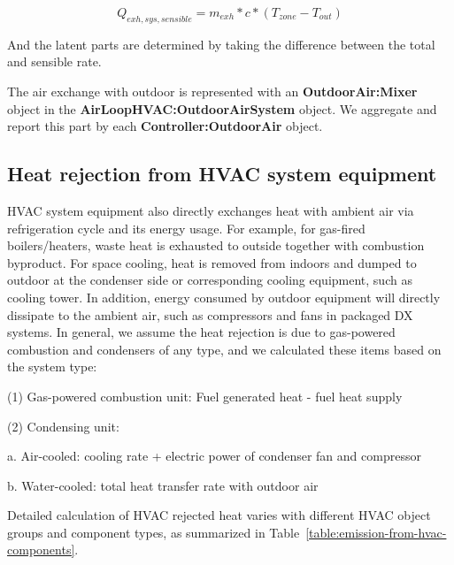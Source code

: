 \begin{equation}  \label{eq:he-7}
Q_{exh, sys, sensible} = m_{exh} * c * (T_{zone} - T_{out})
\end{equation}

And the latent parts are determined by taking the difference between the total and sensible rate.

The air exchange with outdoor is represented with an \textbf{OutdoorAir:Mixer} object in the \textbf{AirLoopHVAC:OutdoorAirSystem} object. We aggregate and report this part by each \textbf{Controller:OutdoorAir} object.

\subsection{Heat rejection from HVAC system equipment}\label{emission-from-HVAC-reject}

HVAC system equipment also directly exchanges heat with ambient air via refrigeration cycle and its energy usage. For example, for gas-fired boilers/heaters, waste heat is exhausted to outside together with combustion byproduct. For space cooling, heat is removed from indoors and dumped to outdoor at the condenser side or corresponding cooling equipment, such as cooling tower. In addition, energy consumed by outdoor equipment will directly dissipate to the ambient air, such as compressors and fans in packaged DX systems. In general, we assume the heat rejection is due to gas-powered combustion and condensers of any type, and we calculated these items based on the system type:

(1)	Gas-powered combustion unit: Fuel generated heat - fuel heat supply

(2)	Condensing unit:

a.	Air-cooled: cooling rate + electric power of condenser fan and compressor

b.	Water-cooled: total heat transfer rate with outdoor air

Detailed calculation of HVAC rejected heat varies with different HVAC object groups and component types, as summarized in Table~\ref{table:emission-from-hvac-components}.

